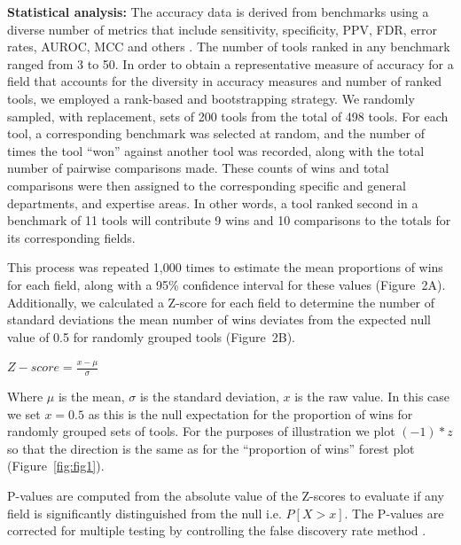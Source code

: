 \documentclass[fleqn,10pt,doc,onecolumn]{SelfArx}%
\begin{document}
\textbf{Statistical analysis:} The accuracy data is derived from
benchmarks using a diverse number of metrics that include sensitivity,
specificity, PPV, FDR, error rates, AUROC, MCC and others
\cite{weber2019essential}. The number of tools ranked in any benchmark
ranged from 3 to 50. In order to obtain a representative measure of
accuracy for a field that accounts for the diversity in accuracy
measures and number of ranked tools, we employed a rank-based and
bootstrapping strategy.  We randomly sampled, with replacement, sets
of 200 tools from the total of 498 tools. For each tool, a
corresponding benchmark was selected at random, and the number of
times the tool ``won'' against another tool was recorded, along with
the total number of pairwise comparisons made. These counts of wins
and total comparisons were then assigned to the corresponding
specific and general departments, and expertise areas.
In other words, a tool ranked second in a benchmark of 11 tools will
contribute 9 wins and 10 comparisons to the totals for its
corresponding fields.

This process was repeated
1,000 times to estimate the mean proportions of wins for each field,
along with a 95\% confidence interval for these values (Figure~2A).
Additionally, we calculated a Z-score for each field to determine the
number of standard deviations the mean number of wins deviates from
the expected null value of 0.5 for randomly grouped tools (Figure~2B).

$Z-score=\frac{x-\mu}{\sigma}$

Where $\mu$ is the mean, $\sigma$ is the standard deviation, $x$ is the raw
value. In this case we set $x=0.5$ as this is the null expectation for
the proportion of wins for randomly grouped sets of tools. For the
purposes of illustration we plot $(-1)*z$ so that the direction is the
same as for the ``proportion of wins'' forest plot
(Figure~\ref{fig:fig1}). 

P-values are computed from the absolute value of the Z-scores to
evaluate if any field is significantly distinguished from the null
i.e. $P[X > x]$. The P-values are corrected for multiple testing by
controlling the false discovery rate method
\cite{benjamini1995controlling}.



\end{document}
